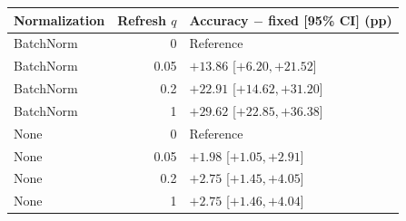 \begin{tabular}{@{}lrl@{}}
\toprule
Normalization & Refresh $q$ & Accuracy $-$ fixed [95\% CI] (pp) \\
\midrule
BatchNorm & 0 & Reference \\
BatchNorm & 0.05 & $+13.86$ [$ +6.20, +21.52 $] \\
BatchNorm & 0.2 & $+22.91$ [$ +14.62, +31.20 $] \\
BatchNorm & 1 & $+29.62$ [$ +22.85, +36.38 $] \\
None & 0 & Reference \\
None & 0.05 & $+1.98$ [$ +1.05, +2.91 $] \\
None & 0.2 & $+2.75$ [$ +1.45, +4.05 $] \\
None & 1 & $+2.75$ [$ +1.46, +4.04 $] \\
\bottomrule
\end{tabular}

